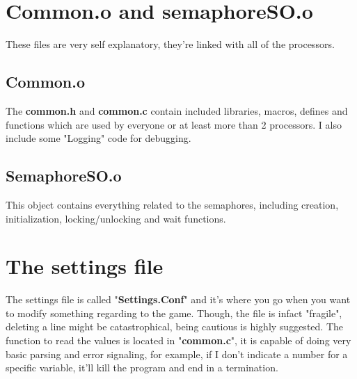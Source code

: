\documentclass[11pt]{article}
\begin{document}
	\section{Common.o and semaphoreSO.o}
	
	These files are very self explanatory, they're linked with all of the processors.
	
	\subsection{Common.o}
	The \textbf{common.h} and \textbf{common.c} contain included libraries, macros, defines and functions which are used by everyone or at least more than 2 processors. I also include some "Logging" code for debugging.
	
	\subsection{SemaphoreSO.o}
	This object contains everything related to the semaphores, including creation, initialization, locking/unlocking and wait functions.
	
	\section{The settings file}
	
	The settings file is called "\textbf{Settings.Conf}" and it's where you go when you want to modify something regarding to the game. Though, the file is infact "fragile", deleting a line might be catastrophical, being cautious is highly suggested. The function to read the values is located in "\textbf{common.c}", it is capable of doing very basic parsing and error signaling, for example, if I don't indicate a number for a specific variable, it'll kill the program and end in a termination.
	
	
	
	
 
\end{document}

